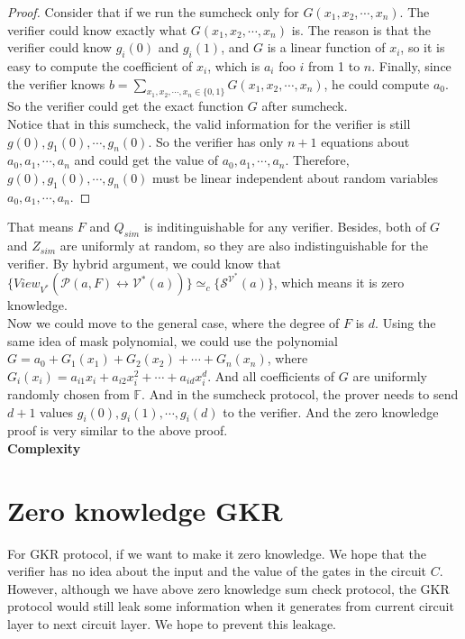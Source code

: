 \begin{proof}
Consider that if we run the sumcheck only for $G(x_1, x_2, \cdots, x_n)$. The verifier could know exactly what $G(x_1, x_2, \cdots, x_n)$ is. The reason is that the verifier could know $g_{i}(0)$ and $g_{i}(1)$, and $G$ is a linear function of $x_i$, so it is easy to compute the coefficient of $x_i$, which is $a_i$ foo $i$ from 1 to $n$. Finally, since the verifier knows $b = \sum\limits_{x_1, x_2, \cdots, x_n \in \{0, 1\}}G(x_1, x_2, \cdots, x_n)$, he could compute $a_0$. So the verifier could get the exact function $G$ after sumcheck.\\  

Notice that in this sumcheck, the valid information for the verifier is still $g(0), g_{1}(0), \cdots, g_{n}(0)$. So the verifier has only $n + 1$ equations about $a_0, a_1, \cdots, a_n$ and could get the value of $a_0, a_1, \cdots, a_n$. Therefore, $g(0), g_{1}(0), \cdots, g_{n}(0)$ must be linear independent about random variables $a_0, a_1, \cdots, a_n$.
\end{proof}

That means $F$ and $Q_{sim}$ is inditinguishable for any verifier. Besides, both of $G$ and $Z_{sim}$ are uniformly at random, so they are also indistinguishable for the verifier. By hybrid argument, we could know that $\{View_{V^*}(\mathcal{P}(a, F) \leftrightarrow \mathcal{V^*}(a))\} \simeq_{c} \{\mathcal{S}^{\mathcal{V^*}}(a)\}$, which means it is zero knowledge.\\

\noindent
Now we could move to the general case, where the degree of $F$ is $d$. Using the same idea of mask polynomial, we could use the polynomial $G = a_{0} + G_1(x_1) + G_2(x_2) + \cdots + G_n(x_n)$, where $G_{i}(x_i) = a_{i1}x_i + a_{i2}x_i^2 + \cdots + a_{id}x_i^d$. And all coefficients of $G$ are uniformly randomly chosen from $\mathbb{F}$. And in the sumcheck protocol, the prover needs to send $d+1$ values $g_{i}(0), g_{i}(1), \cdots, g_i(d)$ to the verifier. And the zero knowledge proof is very similar to the above proof. \\

\noindent
\textbf{Complexity}\\

\section{Zero knowledge GKR}

For GKR protocol, if we want to make it zero knowledge. We hope that the verifier has no idea about the input and the value of the gates in the circuit $C$. However, although we have above zero knowledge sum check protocol, the GKR protocol would still leak some information when it generates from current circuit layer to next circuit layer. We hope to prevent this leakage.\\

